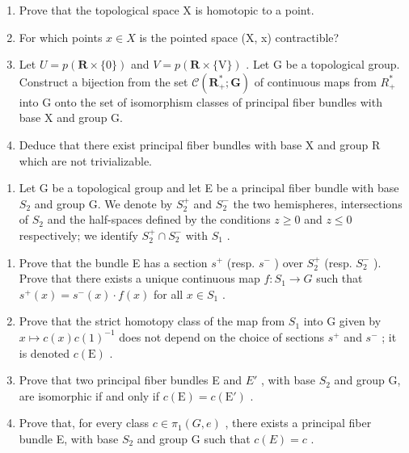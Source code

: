 \begin{enumerate}
\def\labelenumi{\alph{enumi})}
\item
  Prove that the topological space X is homotopic to a point.
\item
  For which points \(x \in X\) is the pointed space (X, x) contractible?
\item
  Let \(U = p(\mathbf{R} \times \{0\})\) and \(V = p(\mathbf{R} \times \{\mathrm{V}\})\) . Let G be a topological group. Construct a bijection from the set \(\mathcal{C}(\mathbf{R}_{+}^{*}; \mathbf{G})\) of continuous maps from \(R_{+}^{*}\) into G onto the set of isomorphism classes of principal fiber bundles with base X and group G.
\item
  Deduce that there exist principal fiber bundles with base X and group R which are not trivializable.
\end{enumerate}

\begin{enumerate}
\def\labelenumi{\arabic{enumi})}
\setcounter{enumi}{6}
\tightlist
\item
  Let G be a topological group and let E be a principal fiber bundle with base \(S_{2}\) and group G. We denote by \(S_{2}^{+}\) and \(S_{2}^{-}\) the two hemispheres, intersections of \(S_{2}\) and the half-spaces defined by the conditions \(z \geqslant 0\) and \(z \leqslant 0\) respectively; we identify \(S_{2}^{+} \cap S_{2}^{-}\) with \(S_{1}\) .
\end{enumerate}

\begin{enumerate}
\def\labelenumi{\alph{enumi})}
\item
  Prove that the bundle E has a section \(s^{+}\) (resp. \(s^{-}\) ) over \(S_{2}^{+}\) (resp. \(S_{2}^{-}\) ). Prove that there exists a unique continuous map \(f\colon S_{1}\to G\) such that \(s^{+}(x)=s^{-}(x)\cdot f(x)\) for all \(x\in S_{1}\) .
\item
  Prove that the strict homotopy class of the map from \(S_{1}\) into G given by \(x \mapsto c(x)c(1)^{-1}\) does not depend on the choice of sections \(s^{+}\) and \(s^{-}\) ; it is denoted \(c(\mathrm{E})\) .
\item
  Prove that two principal fiber bundles E and \(E'\) , with base \(S_{2}\) and group G, are isomorphic if and only if \(c(\mathrm{E}) = c(\mathrm{E}')\) .
\item
  Prove that, for every class \(c \in \pi_{1}(G, e)\) , there exists a principal fiber bundle E, with base \(S_{2}\) and group G such that \(c(E) = c\) .
\end{enumerate}

